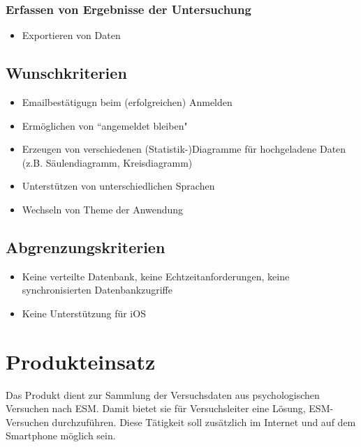 \documentclass[a4paper]{scrreprt}
\begin{document}
            \subsection{Erfassen von Ergebnisse der Untersuchung}
                \begin{itemize}
                    \item Exportieren von Daten  
                \end{itemize}
 
        \section{Wunschkriterien}
            \begin{itemize}
                \item Emailbest\"atigugn beim (erfolgreichen) Anmelden
                \item Erm\"oglichen von ``angemeldet bleiben"
                \item Erzeugen von verschiedenen (Statistik-)Diagramme f\"ur hochgeladene Daten (z.B. S\"aulendiagramm, Kreisdiagramm) 
                \item Unterst\"utzen von unterschiedlichen Sprachen
                \item Wechseln von Theme der Anwendung
            \end{itemize}
 
        \section{Abgrenzungskriterien}
            \begin{itemize}
                \item Keine verteilte Datenbank, keine Echtzeitanforderungen, keine synchronisierten Datenbankzugriffe
                \item Keine Unterst\"utzung f\"ur iOS
            \end{itemize}
 
    \chapter{Produkteinsatz}
        Das Produkt dient zur Sammlung der Versuchsdaten aus psychologischen Versuchen nach ESM. Damit bietet sie für Versuchsleiter eine Lösung, ESM-Versuchen durchzuführen. Diese Tätigkeit soll zusätzlich im Internet und auf dem Smartphone möglich sein.
 
\end{document}
